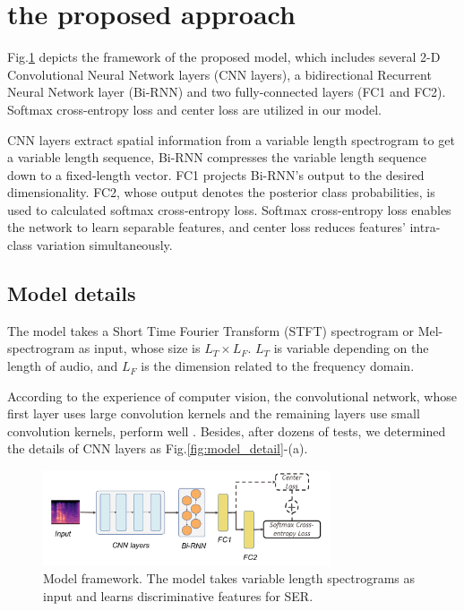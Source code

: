 \documentclass{article}
\begin{document}
\section{the proposed approach}




Fig.\ref{fig:model-framework} depicts the framework of the proposed model, which includes several 2-D Convolutional Neural Network layers ({CNN layers}), a bidirectional Recurrent Neural Network layer ({Bi-RNN}) and two fully-connected layers (FC1 and FC2). Softmax cross-entropy loss and center loss are utilized in our model.

CNN layers extract spatial information from a variable length spectrogram to get a variable length sequence, Bi-RNN compresses the variable length sequence down to a fixed-length vector. FC1 projects Bi-RNN's output to the desired dimensionality. FC2, whose output denotes the posterior class probabilities, is used to calculated softmax cross-entropy loss. Softmax cross-entropy loss enables the network to learn separable features, and center loss reduces features' intra-class variation simultaneously.
\subsection{Model details}
\label{ssec:model-detail}
The model takes a Short Time Fourier Transform ({STFT}) spectrogram or Mel-spectrogram as input, whose size is $L_T \times L_F$. $L_T$ is variable depending on the length of audio, and $L_F$ is the dimension related to the frequency domain.

According to the experience of computer vision, the convolutional network, whose first layer uses large convolution kernels and the remaining layers use small convolution kernels, perform well \cite{simonyan2014very, He2015Deep}. Besides, after dozens of tests, we determined the details of CNN layers as Fig.\ref{fig:model_detail}-(a).

\begin{figure}[htb]
	
	\begin{minipage}[b]{1.0\linewidth}
		\centerline{\includegraphics[width=8.5cm]{fig1}}
	\end{minipage}
	\caption{Model framework. The model takes variable length spectrograms as input and learns discriminative features for SER.}
	\label{fig:model-framework}
\end{figure}
\end{document}
